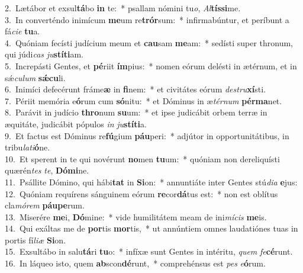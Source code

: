{2.~}Lætábor et exsul\textbf{tá}bo \textbf{in} te:~* psallam nómini tu\textit{o}, \textit{Al}\textbf{tís}\textbf{si}me.\\
{3.~}In converténdo inimícum \textbf{me}um re\textbf{trór}sum:~* infirmabúntur, et períbunt a fá\textit{ci}\textit{e} \textbf{tu}a.\\
{4.~}Quóniam fecísti judícium meum et \textbf{cau}sam \textbf{me}am:~* sedísti super thronum, qui júdi\textit{cas} \textit{ju}\textbf{stí}\textbf{ti}am.\\
{5.~}Increpásti Gentes, et \textbf{pé}riit \textbf{ím}pius:~* nomen eórum delésti in ætérnum, et in sǽ\textit{cu}\textit{lum} \textbf{sǽ}\textbf{cu}li.\\
{6.~}Inimíci defecérunt fráme\textbf{æ} in \textbf{fi}nem:~* et civitátes eórum \textit{de}\textit{stru}\textbf{xí}sti.\\
{7.~}Périit memória e\textbf{ó}rum cum \textbf{só}nitu:~* et Dóminus in æ\textit{tér}\textit{num} \textbf{pér}\textbf{ma}net.\\
{8.~}Parávit in judício \textbf{thro}num \textbf{su}um:~* et ipse judicábit orbem terræ in æquitáte, judicábit pópulos \textit{in} \textit{ju}\textbf{stí}\textbf{ti}a.\\
{9.~}Et factus est Dóminus re\textbf{fú}gium \textbf{páu}peri:~* adjútor in opportunitátibus, in tribu\textit{la}\textit{ti}\textbf{ó}ne.\\
{10.~}Et sperent in te qui novérunt \textbf{no}men \textbf{tu}um:~* quóniam non dereliquísti quærén\textit{tes} \textit{te}, \textbf{Dó}\textbf{mi}ne.\\
{11.~}Psállite Dómino, qui hábi\textbf{tat} in \textbf{Si}on:~* annuntiáte inter Gentes stú\textit{di}\textit{a} \textbf{e}jus:\\
{12.~}Quóniam requírens sánguinem eórum \textbf{re}cor\textbf{dá}tus est:~* non est oblítus cla\textit{mó}\textit{rem} \textbf{páu}\textbf{pe}rum.\\
{13.~}Miserére \textbf{me}i, \textbf{Dó}mine:~* vide humilitátem meam de ini\textit{mí}\textit{cis} \textbf{me}is.\\
{14.~}Qui exáltas me de \textbf{por}tis \textbf{mor}tis,~* ut annúntiem omnes laudatiónes tuas in portis fí\textit{li}\textit{æ} \textbf{Si}on.\\
{15.~}Exsultábo in salu\textbf{tá}ri \textbf{tu}o:~* infíxæ sunt Gentes in intéritu, \textit{quem} \textit{fe}\textbf{cé}runt.\\
{16.~}In láqueo isto, quem \textbf{ab}scon\textbf{dé}runt,~* comprehénsus est \textit{pes} \textit{e}\textbf{ó}rum.\\
